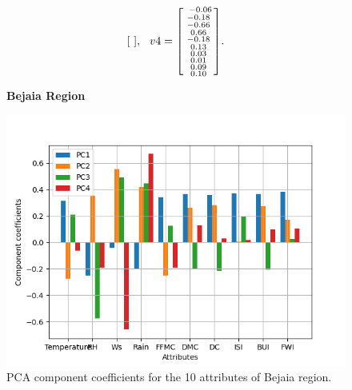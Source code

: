 \documentclass[10pt]{article}
\numberwithin{equation}{section}
\numberwithin{figure}{section}
\numberwithin{table}{section}
\begin{document}
\begin{equation*}
\begin{bsmallmatrix}
        \end{bsmallmatrix}, \hspace{7pt}
    v4 = 
        \begin{bsmallmatrix}
           \
                -0.06\\
                -0.18\\
                -0.66\\
                0.66\\
                -0.18\\
                0.13\\
                0.03\\
                0.01\\
                0.09\\
                0.10
          
        \end{bsmallmatrix}.
                  
\end{equation*}



\begin{figure} [H]
    \centering
    \textbf{Bejaia Region}\par\medskip
    \includegraphics[scale=0.5]{Figures/PC_components_coeff_first_region.png}
    \caption{PCA component coefficients for the 10 attributes of Bejaia region.}
    \label{fig:PCAcoeff1}
\end{figure}
\end{document}
